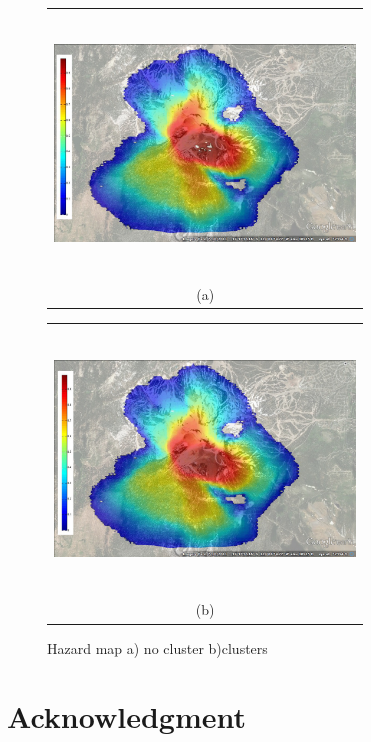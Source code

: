 \documentclass[12pt,letterpaper]{article}
\begin{document}
\begin{figure}[H]
  \begin{minipage}[b]{0.5\textwidth}
    \begin{tabular}{c}
      \includegraphics[width=8cm,height=7cm,keepaspectratio]{figs/hazard_map_noclusters.jpg}\\
      (a)
    \end{tabular}
  \end{minipage}
  \begin{minipage}{0.5\textwidth}
    \begin{tabular}{c}
      \includegraphics[width=8cm,height=7cm,keepaspectratio]{figs/hazard_map_clusters.jpg}\\
      (b)
    \end{tabular}
  \end{minipage}
  \caption{Hazard map a) no cluster b)clusters}\label{fig:fig5}
\end{figure}


\section*{Acknowledgment}
 

 
\end{document}
